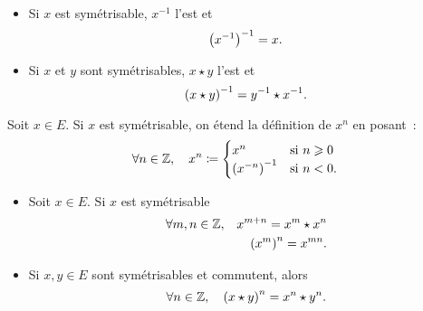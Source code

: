 \documentclass{magnolia}
\begin{document}
\begin{proposition}
\begin{itemize}
\item Si $x$ est symétrisable, $x^{-1}$ l'est et
  \[\left(x^{-1}\right)^{-1}=x.\]
\item Si $x$ et $y$ sont symétrisables, $x\star y$ l'est et
  \[\left(x\star y\right)^{-1}=y^{-1}\star x^{-1}.\]  
\end{itemize}
\end{proposition}

\begin{definition}
Soit $x\in E$. Si $x$ est symétrisable, on étend la définition de $x^n$ en posant~:
\[\forall n\in\mathbb{Z} ,\quad x^n\coloneqq
  \begin{cases}
  x^n & \text{si $n\geqslant 0$}\\
  \left(x^{-n}\right)^{-1} & \text{si $n< 0$}.
  \end{cases}\]
\end{definition}


\begin{proposition}
\begin{itemize}
\item Soit $x\in E$. Si $x$ est symétrisable
\begin{eqnarray*}
\forall m,n\in\mathbb{Z}, & & x^{m+n}=x^m\star x^n\\
                 & & \left(x^m\right)^n=x^{mn}.
\end{eqnarray*}
\item Si $x,y\in E$ sont symétrisables et commutent, alors
\[\forall n\in\mathbb{Z} ,\quad \left(x\star y\right)^n=x^n \star y^n.\]
\end{itemize}
\end{proposition}
\end{document}
